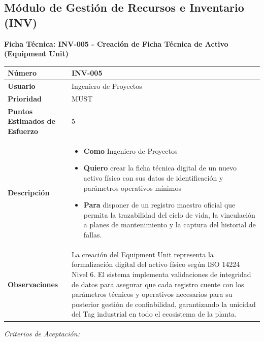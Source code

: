 \subsection{Módulo de Gestión de Recursos e Inventario (INV)}
\noindent\textbf{Ficha Técnica: INV-005 - Creación de Ficha Técnica de Activo (Equipment Unit)}
\footnotesize\setlength{\tabcolsep}{4pt}\renewcommand{\arraystretch}{1.2}
\begin{longtable}{|p{0.21\textwidth}|p{0.74\textwidth}|}\hline
\textbf{Número} & INV-005 \\ \hline
\textbf{Usuario} & Ingeniero de Proyectos \\ \hline
\textbf{Prioridad} & MUST \\ \hline
\textbf{Puntos Estimados de Esfuerzo} & 5 \\ \hline
\textbf{Descripción} & \parbox[t]{\linewidth}{\vspace{2pt}\begin{itemize}[leftmargin=1.5em, nosep, topsep=0pt]
\item \textbf{Como} Ingeniero de Proyectos
\item \textbf{Quiero} crear la ficha técnica digital de un nuevo activo físico con sus datos de identificación y parámetros operativos mínimos
\item \textbf{Para} disponer de un registro maestro oficial que permita la trazabilidad del ciclo de vida, la vinculación a planes de mantenimiento y la captura del historial de fallas.
\end{itemize}\vspace{2pt}} \\ \hline
\textbf{Observaciones} & La creación del Equipment Unit representa la formalización digital del activo físico según ISO 14224 Nivel 6. El sistema implementa validaciones de integridad de datos para asegurar que cada registro cuente con los parámetros técnicos y operativos necesarios para su posterior gestión de confiabilidad, garantizando la unicidad del Tag industrial en todo el ecosistema de la planta. \\ \hline
\end{longtable}\normalsize
\noindent\textit{Criterios de Aceptación:}
